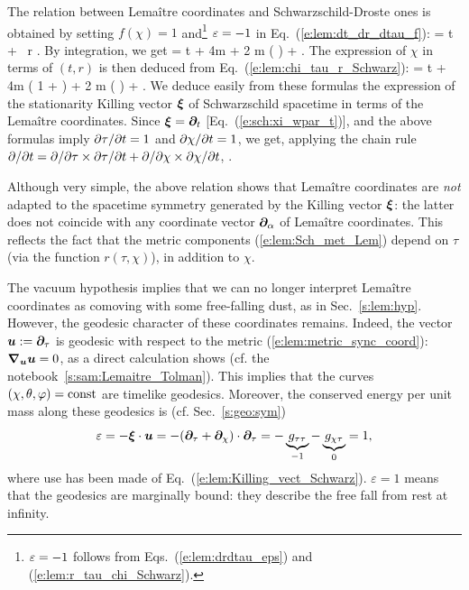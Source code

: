 The relation between Lemaître coordinates and
Schwarzschild-Droste ones is obtained by setting $f(\chi) = 1$ and\footnote{$\varepsilon=-1$
follows from Eqs.~(\ref{e:lem:drdtau_eps}) and (\ref{e:lem:r_tau_chi_Schwarz}).} $\varepsilon=-1$
in Eq.~(\ref{e:lem:dt_dr_dtau_f}):
\be
    \dd\tau = \dd t +
         \, \dd r .
\ee
By integration, we get
\be
    \tau = t + 4m  + 2 m \ln \left(
         \right) + .
\ee
The expression of $\chi$ in terms of $(t,r)$ is then deduced from
Eq.~(\ref{e:lem:chi_tau_r_Schwarz}):
\be
    \chi = t + 4m  \left( 1 +  \right)
        + 2 m \ln \left(
         \right)  + .
\ee
We deduce easily from these formulas the expression of the stationarity
Killing vector $\bm{\xi}$ of Schwarzschild spacetime in terms of the
Lemaître coordinates. Since $\bm{\xi} = \bm{\partial}_t$ [Eq.~(\ref{e:sch:xi_wpar_t})],
and the above formulas
imply ${\partial \tau}/{\partial t} =1$ and ${\partial \chi}/{\partial t}=1$, we get, applying
the chain rule ${\partial }/{\partial t} = {\partial }/{\partial \tau} \times {\partial \tau}/{\partial t} + {\partial }/{\partial \chi} \times {\partial \chi}/{\partial t}$,
\be \label{e:lem:Killing_vect_Schwarz}
    \encadre{\w{\xi} = \wpar_\tau + \wpar_\chi }.
\ee
\begin{remark}
Although very simple, the above relation shows that Lemaître coordinates are \emph{not}
adapted to the spacetime symmetry generated by the Killing vector $\bm{\xi}$:
the latter does not coincide with any coordinate vector $\bm{\partial}_\alpha$ of
Lemaître coordinates. This reflects
the fact that the metric components (\ref{e:lem:Sch_met_Lem}) depend on $\tau$
(via the function $r(\tau,\chi)$), in addition to $\chi$.
\end{remark}

The vacuum hypothesis implies that we can no longer interpret
Lemaître coordinates as comoving with some free-falling dust, as in Sec.~\ref{s:lem:hyp}.
However, the geodesic character of these coordinates remains. Indeed, the vector
$\bm{u} := \bm{\partial}_\tau$ is geodesic with respect to the metric (\ref{e:lem:metric_sync_coord}):
$\bm{\nabla}_{\bm{u}}\bm{u} = 0$, as a direct calculation shows (cf. the notebook~\ref{s:sam:Lemaitre_Tolman}).
This implies that the curves $(\chi,\theta,\varphi)=\mathrm{const}$
are timelike geodesics. Moreover, the conserved energy per unit mass along these geodesics
is (cf. Sec.~\ref{s:geo:sym})
\[
     \varepsilon = - \bm{\xi}\cdot\bm{u} = - (\bm{\partial}_\tau + \bm{\partial}_\chi)\cdot \bm{\partial}_\tau
        = - \underbrace{g_{\tau\tau}}_{-1} - \underbrace{g_{\chi\tau}}_{0} = 1 ,
\]
where use has been made of Eq.~(\ref{e:lem:Killing_vect_Schwarz}).
$\varepsilon=1$ means
that the geodesics are marginally bound: they
describe the free fall from rest at infinity.

